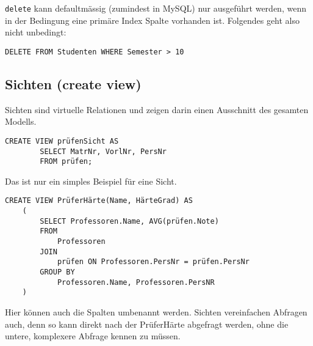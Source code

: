 \texttt{delete} kann defaultmässig (zumindest in MySQL) nur ausgeführt werden, wenn in der Bedingung eine primäre Index Spalte vorhanden ist. Folgendes geht also nicht unbedingt:

\begin{lstlisting}[caption={delete ohne Index}]
    DELETE FROM Studenten WHERE Semester > 10
\end{lstlisting}

\subsection{Sichten (create view)}
Sichten sind virtuelle Relationen und zeigen darin einen Ausschnitt des gesamten Modells. 

\begin{lstlisting}[caption={create view SQL}]
    CREATE VIEW prüfenSicht AS 
        SELECT MatrNr, VorlNr, PersNr
        FROM prüfen;
\end{lstlisting}

Das ist nur ein simples Beispiel für eine Sicht.

\begin{lstlisting}[caption={Komplexere Sicht}]
    CREATE VIEW PrüferHärte(Name, HärteGrad) AS 
    (   
        SELECT Professoren.Name, AVG(prüfen.Note)
        FROM
            Professoren
        JOIN
            prüfen ON Professoren.PersNr = prüfen.PersNr
        GROUP BY 
            Professoren.Name, Professoren.PersNR
    )
\end{lstlisting}
Hier können auch die Spalten umbenannt werden. Sichten vereinfachen Abfragen auch, denn so kann direkt nach der PrüferHärte abgefragt werden, ohne die untere, komplexere Abfrage kennen zu müssen.

